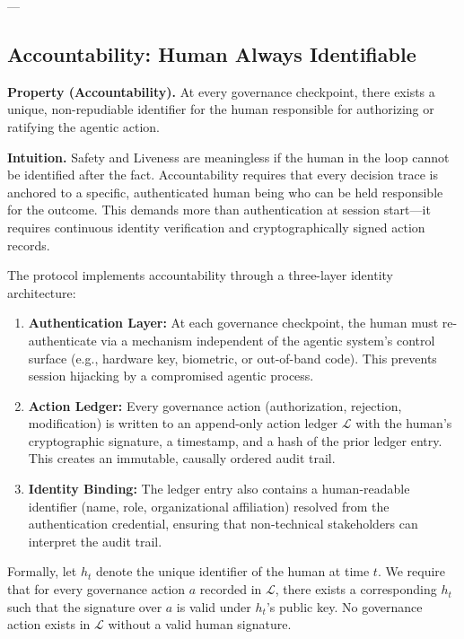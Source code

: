 ---

\subsection{Accountability: Human Always Identifiable}

\textbf{Property (Accountability).} At every governance checkpoint, there exists a unique, non-repudiable identifier for the human responsible for authorizing or ratifying the agentic action.

\textbf{Intuition.} Safety and Liveness are meaningless if the human in the loop cannot be identified after the fact. Accountability requires that every decision trace is anchored to a specific, authenticated human being who can be held responsible for the outcome. This demands more than authentication at session start---it requires continuous identity verification and cryptographically signed action records.

The protocol implements accountability through a three-layer identity architecture:

\begin{enumerate}
\item \textbf{Authentication Layer:} At each governance checkpoint, the human must re-authenticate via a mechanism independent of the agentic system's control surface (e.g., hardware key, biometric, or out-of-band code). This prevents session hijacking by a compromised agentic process.

\item \textbf{Action Ledger:} Every governance action (authorization, rejection, modification) is written to an append-only action ledger $\mathcal{L}$ with the human's cryptographic signature, a timestamp, and a hash of the prior ledger entry. This creates an immutable, causally ordered audit trail.

\item \textbf{Identity Binding:} The ledger entry also contains a human-readable identifier (name, role, organizational affiliation) resolved from the authentication credential, ensuring that non-technical stakeholders can interpret the audit trail.
\end{enumerate}

Formally, let $h_t$ denote the unique identifier of the human at time $t$. We require that for every governance action $a$ recorded in $\mathcal{L}$, there exists a corresponding $h_t$ such that the signature over $a$ is valid under $h_t$'s public key. No governance action exists in $\mathcal{L}$ without a valid human signature.

